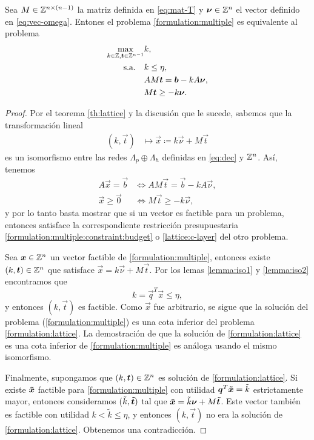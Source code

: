 \begin{theorem}
	\label{th:multeq}
	Sea $M \in \mathbb{Z}^{n \times (n - 1)}$ la matriz definida en \eqref{eq:mat-T} y $\boldsymbol{\nu} \in \mathbb{Z}^n$
	el vector definido en \eqref{eq:vec-omega}. Entones el problema \eqref{formulation:multiple} es
	equivalente al problema
	\begin{subequations}
		\label{formulation:lattice}
		\begin{align}
			\max_{k \in \mathbb{Z}, \boldsymbol{t} \in \mathbb{Z}^{n-1}}
				& k, \\
			\text{s.a.} \quad
				& k \leq \eta, \label{lattice:c-layer} \\
				& AM\boldsymbol{t} = \boldsymbol{b} - kA\boldsymbol{\nu}, \label{lattice:constraints} \\
				& M\boldsymbol{t} \geq -k\boldsymbol{\nu}.
		\end{align}
	\end{subequations}
\end{theorem}
\begin{proof}
	Por el teorema \ref{th:lattice} y la discusión que le sucede, sabemos que la transformación
	lineal
	\begin{align*}
		(k, \vec{t}) &\mapsto \vec{x} \coloneq k\vec{\nu} + M\vec{t}
	\end{align*}
	es un isomorfismo entre las redes $\Lambda_p \oplus \Lambda_h$ definidas en \eqref{eq:dec} y
	$\mathbb{Z}^n$. Así, tenemos
	\begin{align*}
		A\vec{x} = \vec{b} &\iff AM\vec{t} = \vec{b} - kA\vec{\nu}, \\
		\vec{x} \geq \vec{0} &\iff M\vec{t} \geq -k\vec{\nu},
	\end{align*}
	y por lo tanto basta mostrar que si un vector es factible para un problema, entonces satisface
	la correspondiente restricción presupuestaria \eqref{formulation:multiple:constraint:budget} o
	\eqref{lattice:c-layer} del otro problema.

	Sea $\boldsymbol{x} \in \mathbb{Z}^n$ un vector factible de \eqref{formulation:multiple}, entonces existe $(k,
	\boldsymbol{t}) \in \mathbb{Z}^n$ que satisface $\vec{x} = k\vec{\nu} + M\vec{t}$. Por los lemas \ref{lemma:iso1}
	y \ref{lemma:iso2} encontramos que
	\begin{equation*}
		k = \vec{q}^T\vec{x} \leq \eta,
	\end{equation*}
	y entonces $(k, \vec{t})$ es factible. Como $\vec{x}$ fue arbitrario, se sigue que la solución
	del problema (\ref{formulation:multiple}) es una cota inferior del problema
	\eqref{formulation:lattice}. La demostración de que la solución de \eqref{formulation:lattice}
	es una cota inferior de \eqref{formulation:multiple} es análoga usando el mismo isomorfismo.

	Finalmente, supongamos que $(k, \boldsymbol{t}) \in \mathbb{Z}^n$ es solución de \eqref{formulation:lattice}.
	Si existe $\boldsymbol{\tilde{x}}$ factible para \eqref{formulation:multiple} con utilidad $\boldsymbol{q}^T\boldsymbol{\tilde{x}}
	= \tilde{k}$ estrictamente mayor, entonces consideramos ($\tilde{k}, \boldsymbol{\tilde{t}})$ tal que
	$\boldsymbol{\tilde{x}} = \tilde{k}\boldsymbol{\nu} + M\boldsymbol{\tilde{t}}$. Este vector también es factible con utilidad $k <
	\tilde{k} \leq \eta$, y entonces $(k, \vec{t})$ no era la solución de
	\eqref{formulation:lattice}. Obtenemos una contradicción.
\end{proof}

